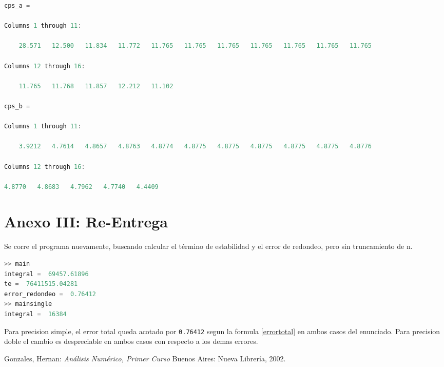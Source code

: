 \documentclass[11pt,a4paper]{article}
\begin{document}
\begin{lstlisting}[language=Octave,title=Cps calculados para las distintas iteraciones]
cps_a =

Columns 1 through 11:

    28.571   12.500   11.834   11.772   11.765   11.765   11.765   11.765   11.765   11.765   11.765

Columns 12 through 16:

    11.765   11.768   11.857   12.212   11.102

cps_b =

Columns 1 through 11:

    3.9212   4.7614   4.8657   4.8763   4.8774   4.8775   4.8775   4.8775   4.8775   4.8775   4.8776

Columns 12 through 16:

4.8770   4.8683   4.7962   4.7740   4.4409
\end{lstlisting}


\newpage
\section{Anexo III: Re-Entrega}

Se corre el programa nuevamente, buscando calcular el término de estabilidad y el error de redondeo, pero sin truncamiento de n.


\begin{lstlisting}[language=Octave,title=Corrida entera sin truncamiento]
>> main
integral =  69457.61896
te =  76411515.04281
error_redondeo =  0.76412
>> mainsingle
integral =  16384
\end{lstlisting}

Para precision simple, el error total queda acotado por \texttt{0.76412} segun la formula \ref{errortotal} en ambos casos del enunciado. Para precision doble el cambio es despreciable en ambos casos con respecto a los demas errores.

\newpage

{}
\renewcommand\refname{Bibliografía}
\begin{thebibliography}{9}

Gonzales, Hernan: 
\textit{Análisis Numérico, Primer Curso}
Buenos Aires: Nueva Librería, 2002.

\end{thebibliography}
\end{document}
